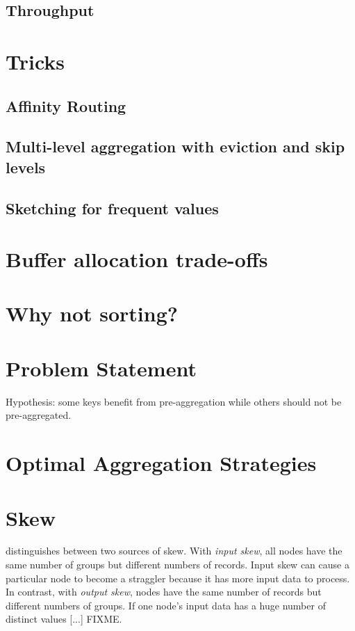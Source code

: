 \documentclass[12pt]{article}
\begin{document}
\subsection{Throughput}

\pagebreak
\section{Tricks}

\subsection{Affinity Routing}

\subsection{Multi-level aggregation with eviction and skip levels}

\subsection{Sketching for frequent values}

\section{Buffer allocation trade-offs}

\section{Why not sorting?}

\section{Problem Statement}
Hypothesis: some keys benefit from pre-aggregation while others should not be pre-aggregated.

\section{Optimal Aggregation Strategies}

\section{Skew}

\cite{adaptive-aggregation} distinguishes between two sources of skew.
With \emph{input skew}, all nodes have the same number of groups but different numbers of records.  Input skew can cause a particular node to become a straggler because it has more input data to process.  In contrast, with \emph{output skew}, nodes have the same number of records but different numbers of groups.  If one node's input data has a huge number of distinct values [...] FIXME.
\end{document}

